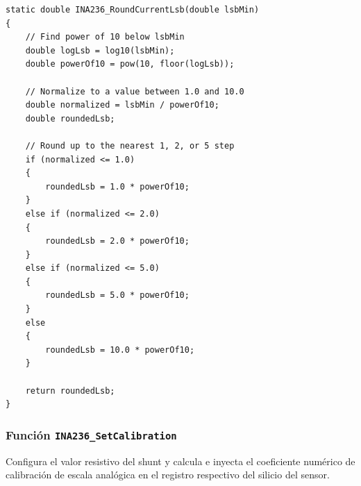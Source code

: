 \documentclass[
10pt, %
a4paper, %
oneside, %
headinclude,footinclude, %
BCOR5mm, %
]{scrartcl}
\begin{document}
\begin{lstlisting}[style=CMakeStyle]
static double INA236_RoundCurrentLsb(double lsbMin)
{
    // Find power of 10 below lsbMin
    double logLsb = log10(lsbMin);
    double powerOf10 = pow(10, floor(logLsb));
    
    // Normalize to a value between 1.0 and 10.0
    double normalized = lsbMin / powerOf10;
    double roundedLsb;
    
    // Round up to the nearest 1, 2, or 5 step
    if (normalized <= 1.0)
    {
        roundedLsb = 1.0 * powerOf10;
    }
    else if (normalized <= 2.0)
    {
        roundedLsb = 2.0 * powerOf10;
    }
    else if (normalized <= 5.0)
    {
        roundedLsb = 5.0 * powerOf10;
    }
    else
    {
        roundedLsb = 10.0 * powerOf10;
    }
    
    return roundedLsb;
}
\end{lstlisting}

\subsubsection{Función \texttt{INA236\_SetCalibration}}
Configura el valor resistivo del shunt y calcula e inyecta el coeficiente numérico de calibración de escala analógica en el registro respectivo del silicio del sensor.
\end{document}
